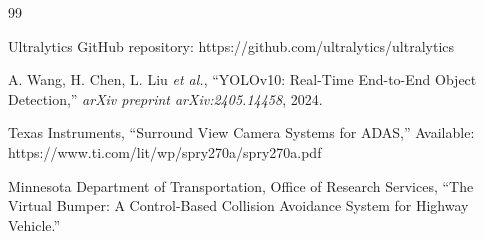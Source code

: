 \begingroup
\renewcommand{\section}[2]{}  
\begin{thebibliography}{99}

Ultralytics GitHub repository: https://github.com/ultralytics/ultralytics

A. Wang, H. Chen, L. Liu \textit{et al.}, 
“YOLOv10: Real-Time End-to-End Object Detection,” 
\textit{arXiv preprint arXiv:2405.14458}, 2024.

Texas Instruments, 
“Surround View Camera Systems for ADAS,” 
Available: https://www.ti.com/lit/wp/spry270a/spry270a.pdf

Minnesota Department of Transportation, Office of Research Services,  
“The Virtual Bumper: A Control-Based Collision Avoidance System for Highway Vehicle.”

\end{thebibliography}
\endgroup